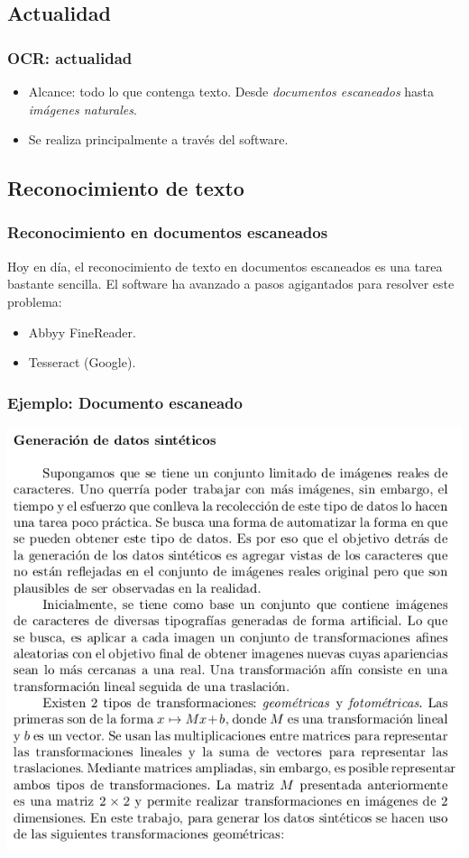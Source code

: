 	\subsection*{Actualidad}
		\begin{frame}
			\frametitle{OCR: actualidad}
			\begin{itemize}
				\item<1-> Alcance: todo lo que contenga texto. Desde \textit{documentos escaneados} hasta \textit{imágenes naturales}.
				\item<2-> Se realiza principalmente a través del software.
			\end{itemize}
		\end{frame}
	\subsection{Reconocimiento de texto}
		\begin{frame}
			\frametitle{Reconocimiento en documentos escaneados}
			Hoy en día, el reconocimiento de texto en documentos escaneados es una tarea bastante sencilla. El software ha avanzado a pasos agigantados para resolver este problema:
			\begin{itemize}
				\item Abbyy FineReader.
				\item Tesseract (Google).
			\end{itemize}
		\end{frame}
		\begin{frame}
			\frametitle{Ejemplo: Documento escaneado}
			\begin{center}
				\includegraphics[height=0.65\paperheight]{imgs/texto_plano.png}
			\end{center}
		\end{frame}
